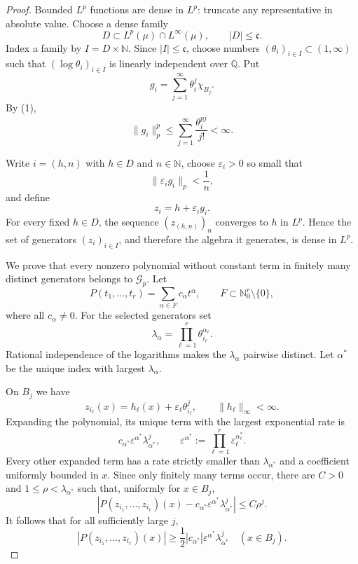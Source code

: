 \documentclass[11pt]{article}
\newcommand{\N}{\mathbb N}
\newcommand{\cG}{\mathcal G}
\begin{document}
\begin{proof}
Bounded $L^p$ functions are dense in $L^p$: truncate any representative in
absolute value.  Choose a dense family
\[
  D\subset L^p(\mu)\cap L^\infty(\mu),
  \qquad |D|\leq\mathfrak c.
\]
Index a family by $I=D\times\N$.  Since $|I|\leq\mathfrak c$, choose numbers
$(\theta_i)_{i\in I}\subset(1,\infty)$ such that
$(\log\theta_i)_{i\in I}$ is linearly independent over $\mathbb Q$.  Put
\[
  g_i=\sum_{j=1}^\infty\theta_i^j\chi_{B_j}.
\]
By (1),
\[
 \|g_i\|_p^p
 \leq\sum_{j=1}^\infty\frac{\theta_i^{pj}}{j!}<\infty.
\]

Write $i=(h,n)$ with $h\in D$ and $n\in\N$, choose $\varepsilon_i>0$ so
small that
\[
  \|\varepsilon_i g_i\|_p<\frac1n,
\]
and define
\[
  z_i=h+\varepsilon_i g_i.
\]
For every fixed $h\in D$, the sequence $(z_{(h,n)})_n$ converges to $h$ in
$L^p$.  Hence the set of generators $(z_i)_{i\in I}$, and therefore the
algebra it generates, is dense in $L^p$.

We prove that every nonzero polynomial without constant term in finitely many
distinct generators belongs to $\cG_p$.  Let
\[
 P(t_1,\ldots,t_r)=\sum_{\alpha\in F}c_\alpha t^\alpha,
 \qquad
 F\subset\N_0^r\setminus\{0\},
\]
where all $c_\alpha\ne0$.  For the selected generators set
\[
 \lambda_\alpha=\prod_{\ell=1}^r\theta_{i_\ell}^{\alpha_\ell}.
\]
Rational independence of the logarithms makes the $\lambda_\alpha$ pairwise
distinct.  Let $\alpha^*$ be the unique index with largest $\lambda_\alpha$.

On $B_j$ we have
\[
 z_{i_\ell}(x)=h_\ell(x)+\varepsilon_\ell\theta_{i_\ell}^j,
 \qquad \|h_\ell\|_\infty<\infty.
\]
Expanding the polynomial, its unique term with the largest exponential rate
is
\[
 c_{\alpha^*}\varepsilon^{\alpha^*}
 \lambda_{\alpha^*}^j,
 \qquad
 \varepsilon^{\alpha^*}:=
 \prod_{\ell=1}^r\varepsilon_\ell^{\alpha^*_\ell}.
\]
Every other expanded term has a rate strictly smaller than
$\lambda_{\alpha^*}$ and a coefficient uniformly bounded in $x$.  Since only
finitely many terms occur, there are $C>0$ and
$1\leq\rho<\lambda_{\alpha^*}$ such that, uniformly for $x\in B_j$,
\begin{equation}
 \left|P(z_{i_1},\ldots,z_{i_r})(x)
 -c_{\alpha^*}\varepsilon^{\alpha^*}
  \lambda_{\alpha^*}^j\right|
 \leq C\rho^j.
\end{equation}
It follows that for all sufficiently large $j$,
\begin{equation}
 |P(z_{i_1},\ldots,z_{i_r})(x)|
 \geq\frac12|c_{\alpha^*}|\varepsilon^{\alpha^*}
       \lambda_{\alpha^*}^j
 \quad (x\in B_j).
\end{equation}


\end{proof}
\end{document}
